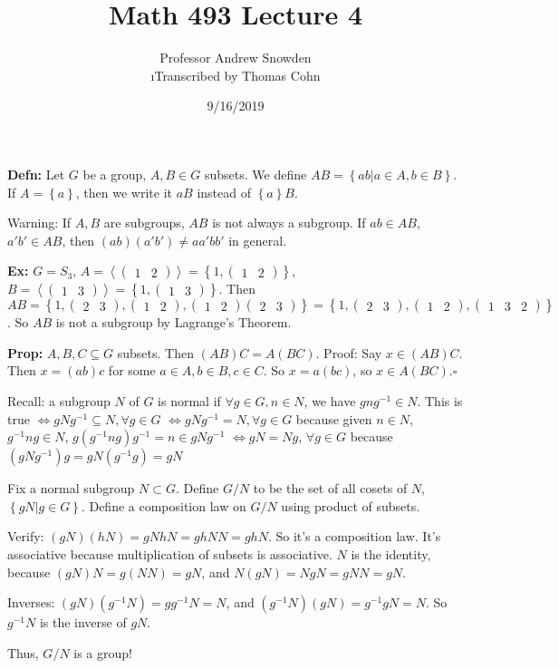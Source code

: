 \documentclass[10pt,letterpaper]{article}
\author{Professor Andrew Snowden\\ \small\i{Transcribed by Thomas Cohn}}
\title{Math 493 Lecture 4}
\date{9/16/2019} %
\newcommand{\n}{\hfill\break}
\newcommand{\hangblock}[2]{\par\noindent\settowidth{\hangindent}{\textbf{#1: }}\textbf{#1: }\!\!\!#2}
\newcommand{\defn}[1]{\hangblock{Defn}{#1}}
\newcommand{\prop}[1]{\hangblock{Prop}{#1}}
\newcommand{\ex}[1]{\hangblock{Ex}{#1}}
\newcommand{\proven}{\;$\square$\n}
\newcommand{\set}[1]{\left\{#1\right\}}
\newcommand{\inv}{^{-1}}
\newcommand{\smallPMatrix}[1]{\paren{\begin{smallmatrix}#1\end{smallmatrix}}}
\newcommand{\generated}[1]{\left<#1\right>}
\newcommand{\cycle}[1]{\smallPMatrix{#1}}
\newcommand{\paren}[1]{\left(#1\right)}
\begin{document}
\maketitle
\setlength\RaggedRightParindent{\parindent}
\RaggedRight

\defn{
	Let $G$ be a group, $A,B\in{}G$ subsets. We define $AB=\set{ab|a\in{}A,b\in{}B}$. If $A=\set{a}$, then we write it $aB$ instead of $\set{a}B$.\n
}

\par\noindent
Warning: If $A,B$ are subgroups, $AB$ is not always a subgroup. If $ab\in{}AB$, $a'b'\in{}AB$, then\n
$(ab)(a'b')\ne{}aa'bb'$ in general.\n

\ex{
	$G=S_{3}$, $A=\generated{\cycle{1 & 2}}=\set{1,\cycle{1 & 2}}$, $B=\generated{\cycle{1 & 3}}=\set{1, \cycle{1 & 3}}$. Then\n
	$AB=\set{1,\cycle{2 & 3},\cycle{1 & 2},\cycle{1 & 2}\cycle{2 & 3}}=\set{1,\cycle{2 & 3},\cycle{1 & 2},\cycle{1 & 3 & 2}}$. So $AB$ is not a subgroup by Lagrange's Theorem.\n
}

\prop{
	$A,B,C\subseteq{}G$ subsets. Then $(AB)C=A(BC)$.\n
	Proof: Say $x\in(AB)C$. Then $x=(ab)c$ for some $a\in{}A,b\in{}B,c\in{}C$. So $x=a(bc)$, so $x\in{}A(BC)$.\proven
}

\par\noindent
Recall: a subgroup $N$ of $G$ is normal if $\forall{}g\in{}G,n\in{}N$, we have $gng\inv\in{}N$. This is true\n
$\Leftrightarrow{}gNg\inv\subseteq{}N,\forall{}g\in{}G$\n
$\Leftrightarrow{}gNg\inv=N,\forall{}g\in{}G$ because given $n\in{}N$, $g\inv{}ng\in{}N$, $g(g\inv{}ng)g\inv=n\in{}gNg\inv$\n
$\Leftrightarrow{}gN=Ng$, $\forall{}g\in{}G$ because $(gNg\inv)g=gN(g\inv{}g)=gN$\n

\par\noindent
Fix a normal subgroup $N\subset{}G$. Define $G/N$ to be the set of all cosets of $N$, $\set{gN|g\in{}G}$. Define a composition law on $G/N$ using product of subsets.\n

\par\noindent
Verify: $(gN)(hN)=gNhN=ghNN=ghN$. So it's a composition law. It's associative because multiplication of subsets is associative. $N$ is the identity, because $(gN)N=g(NN)=gN$, and\n
$N(gN)=NgN=gNN=gN$.\n

\par\noindent
Inverses: $(gN)(g\inv{}N)=gg\inv{}N=N$, and $(g\inv{}N)(gN)=g\inv{}gN=N$. So $g\inv{}N$ is the inverse of $gN$.\n

\par\noindent
Thus, $G/N$ is a group!\n
\end{document}
